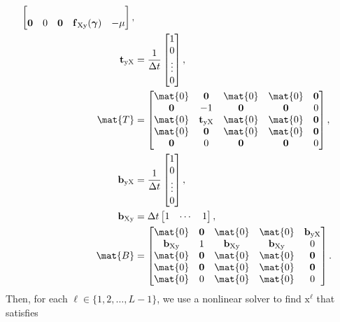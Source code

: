 \documentclass{jpmarticle}
\renewcommand{\vec}[1]{\boldsymbol{\mathrm{#1}}}
\let\subequationsorig\subequations%
\let\endsubequationsorig\endsubequations%
\renewenvironment{subequations}{
  \subequationsorig
  \renewcommand{\theequation}{\theparentequation.\arabic{equation}}
}{
  \endsubequationsorig
}
\begin{document}
\begin{subequations}
\begin{align}
\begin{bmatrix}
      \\
      \vec{0} & 0 & \vec{0} & \vec{f}_{\mathrm{Xy}}(\vec{\gamma}) & - \mu
    \end{bmatrix},
    \\
    \vec{t}_{\mathrm{yX}} &=
    \frac{1}{\Delta t}
    \begin{bmatrix}
      1 \\ 0 \\ \vdots \\ 0
    \end{bmatrix},
    \\
    \mat{T} &=
    \begin{bmatrix}
      \mat{0} & \vec{0} & \mat{0} & \mat{0} & \vec{0}
      \\
      \vec{0} & - 1 & \vec{0} & \vec{0} & 0
      \\
      \mat{0} & \vec{t}_{\mathrm{yX}} & \mat{0} & \mat{0} & \vec{0}
      \\
      \mat{0} & \vec{0} & \mat{0} & \mat{0} & \vec{0}
      \\
      \vec{0} & 0 & \vec{0} & \vec{0} & 0
    \end{bmatrix},
    \\
    \vec{b}_{\mathrm{yX}} &=
    \frac{1}{\Delta t}
    \begin{bmatrix}
      1 \\ 0 \\ \vdots \\ 0
    \end{bmatrix},
    \\
    \vec{b}_{\mathrm{Xy}} &=
    \Delta t
    \begin{bmatrix}
      1 & \cdots & 1
    \end{bmatrix},
    \\
    \mat{B} &=
    \begin{bmatrix}
      \mat{0} & \vec{0} & \mat{0} & \mat{0} & \vec{b}_{\mathrm{yX}}
      \\
      \vec{b}_{\mathrm{Xy}} & 1 & \vec{b}_{\mathrm{Xy}} & \vec{b}_{\mathrm{Xy}} & 0
      \\
      \mat{0} & \vec{0} & \mat{0} & \mat{0} & \vec{0}
      \\
      \mat{0} & \vec{0} & \mat{0} & \mat{0} & \vec{0}
      \\
      \mat{0} & 0 & \mat{0} & \mat{0} & 0
    \end{bmatrix}.
  \end{align}
  Then, for each $\ell \in \{1, 2, \ldots, L - 1\}$,
  we use a nonlinear solver to find $\vec{x}^{\ell}$ that satisfies

\end{subequations}
\end{document}
